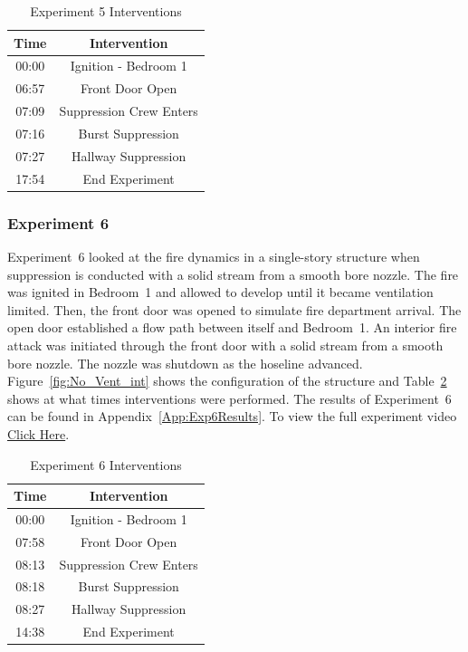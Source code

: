\documentclass[12pt,oneside]{book}
\begin{document}
\begin{table}[!ht]
	\centering
	\caption{Experiment 5 Interventions}
	\begin{tabular}{|c|c|} 
		\hline
		Time & Intervention \\ \hline \hline
		00:00 & Ignition - Bedroom 1 \\ \hline
		06:57 & Front Door Open \\ \hline
		07:09 & Suppression Crew Enters\\ \hline
		07:16 & Burst Suppression \\ \hline 
		07:27 & Hallway Suppression \\ \hline
		17:54 & End Experiment\\ \hline
	\end{tabular}
	\label{Table:Exp5Interventions}
\end{table}

\FloatBarrier
\clearpage

\subsubsection{Experiment 6}
Experiment~6 looked at the fire dynamics in a single-story structure when suppression is conducted with a solid stream from a smooth bore nozzle. The fire was ignited in Bedroom~1 and allowed to develop until it became ventilation limited. Then, the front door was opened to simulate fire department arrival. The open door established a flow path between itself and Bedroom~1. An interior fire attack was initiated through the front door with a solid stream from a smooth bore nozzle. The nozzle was shutdown as the hoseline advanced. Figure~\ref{fig:No_Vent_int} shows the configuration of the structure and Table~\ref{Table:Exp6Interventions} shows at what times interventions were performed. The results of Experiment~6 can be found in Appendix~\ref{App:Exp6Results}. To view the full experiment video \href{https://player.vimeo.com/video/170510936?autoplay=1}{Click Here}.

\begin{table}[!ht]
	\centering
	\caption{Experiment 6 Interventions}
	\begin{tabular}{|c|c|} 
		\hline
		Time & Intervention \\ \hline \hline
		00:00 & Ignition - Bedroom 1 \\ \hline
		07:58 & Front Door Open \\ \hline
		08:13 & Suppression Crew Enters\\ \hline
		08:18 & Burst Suppression \\ \hline 
		08:27 & Hallway Suppression \\ \hline
		14:38 & End Experiment\\ \hline
	\end{tabular}
	\label{Table:Exp6Interventions}
\end{table}
\end{document}
